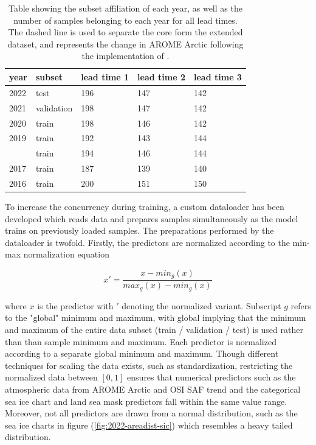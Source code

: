 \documentclass[../main/thesis]{subfiles}
\begin{document}
\begin{table}[]
    \caption{\label{tab:data_subset_sizes}Table showing the subset affiliation of each year, as well as the number of samples belonging to each year for all lead times. The dashed line is used to separate the core form the extended dataset, and represents the change in AROME Arctic following the implementation of \protect\citep{Batrak2019}.}
    \centering
    \setlength{\arrayrulewidth}{0.5mm}
    \renewcommand{\arraystretch}{1.3}
    \begin{tabular}{lllll}
    \hline
    year   & subset & lead time 1  & lead time 2 & lead time 3 \\
    \hline
    2022 & test       & 196 & 147 & 142 \\
    2021 & validation & 198 & 147 & 142 \\
    2020 & train      & 198 & 146 & 142 \\
    2019 & train      & 192 & 143 & 144 \\
    \hdashline
    2018 & train      & 194 & 146 & 144 \\
    2017 & train      & 187 & 139 & 140 \\
    2016 & train      & 200 & 151 & 150 \\
    \hline         
    \end{tabular}
\end{table}

To increase the concurrency during training, a custom dataloader has been developed which reads data and prepares samples simultaneously as the model trains on previously loaded samples. The preparations performed by the dataloader is twofold. Firstly, the predictors are normalized according to the min-max normalization equation 

\begin{equation}
    x' = \frac{x - min_g(x)}{max_g(x) - min_g(x)}
\end{equation}

where $x$ is the predictor with $'$ denoting the normalized variant. Subscript $g$ refers to the "global" minimum and maximum, with global implying that the minimum and maximum of the entire data subset (train / validation / test) is used rather than than sample minimum and maximum. Each predictor is normalized according to a separate global minimum and maximum. Though different techniques for scaling the data exists, such as standardization, restricting the normalized data between $\left[0, 1\right]$ ensures that numerical predictors such as the atmospheric data from AROME Arctic and OSI SAF trend and the categorical sea ice chart and land sea mask predictors fall within the same value range. Moreover, not all predictors are drawn from a normal distribution, such as the sea ice charts in figure (\ref{fig:2022-areadist-sic}) which resembles a heavy tailed distribution.
\end{document}
